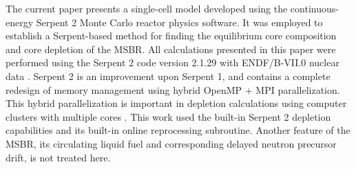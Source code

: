 The current paper presents a single-cell model developed using the
continuous-energy Serpent 2 Monte Carlo reactor physics software. It was 
employed to establish a Serpent-based method for finding the equilibrium core composition and 
core depletion of the \gls{MSBR}.
All calculations presented in this paper were performed using the Serpent 2 
code version 2.1.29 with ENDF/B-VII.0
nuclear data \cite{leppanen_serpent_2012,chadwick_endf/b-vii.0:_2006}. Serpent 
2 is an improvement upon Serpent 1, and contains a complete 
redesign of memory management using hybrid OpenMP + MPI parallelization.  This 
hybrid parallelization is important in depletion calculations using computer 
clusters with multiple cores \cite{leppanen_serpent_2015}. This work used the 
built-in Serpent 2 depletion capabilities and its built-in online reprocessing 
subroutine. Another feature of the \gls{MSBR}, its circulating liquid fuel and 
corresponding delayed neutron precursor drift, is not treated here.
